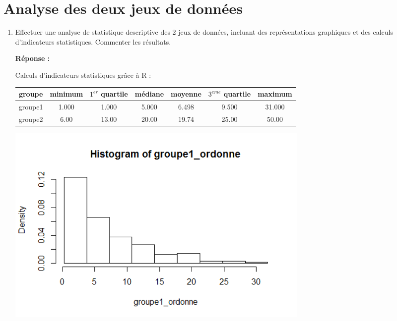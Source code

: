 \documentclass[12pt]{article}
\begin{document}
\section{Analyse des deux jeux de données}

\begin{enumerate}

\renewcommand{\labelenumi}{\arabic{section}.\arabic{enumi}.}

\item Effectuer une analyse de statistique descriptive des 2 jeux de données, incluant des représentations graphiques et des calculs d'indicateurs statistiques. Commenter les résultats.

\textbf{Réponse : \\}

Calculs d'indicateurs statistiques grâce à R : \\

\begin{tabular}{|c|c|c |c |c |c |c|}

	\hline
	groupe &minimum & $1^{er}$ quartile & médiane & moyenne & $3^{eme}$ quartile & maximum \tabularnewline
	\hline
	groupe1 & 1.000 & 1.000& 5.000& 6.498 & 9.500 & 31.000 \tabularnewline
	\hline
	groupe2 & 6.00 & 13.00 & 20.00 & 19.74 & 25.00 & 50.00 \tabularnewline
	\hline
\end{tabular}

\vspace{1cm}


\begin{center}
\includegraphics[width = 15cm]{graphics/q2_1-groupe1.png}
\label{fig2}
\end{center}




\end{enumerate}
\end{document}
